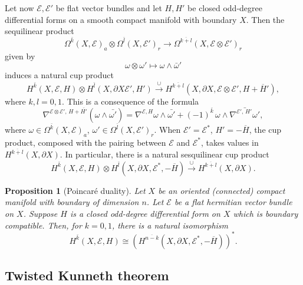\documentclass[12pt]{amsart}
\theoremstyle{plain}
\newtheorem{proposition}[theorem]{Proposition}
\theoremstyle{definition}
\theoremstyle{remark}
\begin{document}
{{Let now ${\mathcal E},{\mathcal E}'$ be flat vector bundles and let $H,H'$ be closed odd-degree
differential forms on a smooth compact manifold with boundary $X$.
Then the sequilinear product \label{lemma:cup}
\[   \Omega^{\bar k}(X,{\mathcal E})_a\otimes\Omega^{\bar l}(X,{\mathcal E}')_r
{\longrightarrow}\Omega^{\overline{k+l}}(X,{\mathcal E}\otimes{\mathcal E}')_r  \]
given by 
$$
\omega \otimes \omega' \longmapsto \omega \wedge \bar \omega'
$$
induces a natural cup product
\[   H^{\bar k}(X,{\mathcal E},H)\otimes H^{\bar l}(X, \partial X {\mathcal E}',H')
  \stackrel{\cup}{\longrightarrow}H^{\overline{k+l}}(X,\partial X, {\mathcal E}\otimes{\mathcal E}',H+\overline H'), \]
where $k,l=0,1$.
This is a consequence of the formula
\[  \nabla^{{\mathcal E}\otimes{\mathcal E}'\!,\,H+{{\bar {H'}}}}(\omega\wedge{{\bar{\omega'}}})=\nabla^{{\mathcal E},H}\omega
    \wedge {{{\bar{\omega'}}}}+(-1)^{\bar k}\,\omega\wedge{{\bar{\nabla^{{\mathcal E}'\!,\,H'}\omega'}}},   \]
where $\omega\in\Omega^{\bar k}(X,{\mathcal E})_a$, $\omega'\in\Omega^{\bar l}(X,{\mathcal E}')_r$.
When ${\mathcal E}'={\mathcal E}^*$, $H'=-\overline H$, the cup product, composed with the pairing between
${\mathcal E}$ and ${\mathcal E}^*$, takes values in $H^{\overline{k+l}}(X, \partial X)$. In particular, there is a natural sesquilinear cup product
\[   H^{\bar k}(X,{\mathcal E},H)\otimes H^{\bar l}(X, \partial X,{\mathcal E}^*,-\overline H)
  \stackrel{\cup}{\longrightarrow}H^{\overline{k+l}}(X, \partial X).                \]
}}

\begin{proposition}[Poincar\'e duality]\label{prop:pd}
Let $X$ be an oriented {{(connected)}} compact manifold with boundary of dimension $n$.
Let ${\mathcal E}$ be a flat hermitian vector bundle on $X$. 
Suppose $H$ is a closed odd-degree differential form on $X$ which is boundary compatible.
Then, for $k=0,1$, there is a natural isomorphism
\[   H^{\bar k}(X,{\mathcal E},H)\cong(H^{\overline{n-k}}(X, \partial X, {\mathcal E}^*,-\overline H))^*.   \]
\end{proposition}

\subsection{Twisted Kunneth theorem}
\end{document}
